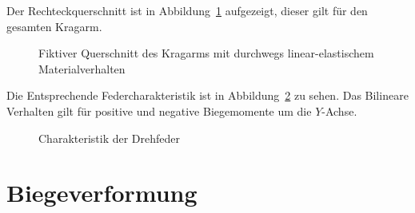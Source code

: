 \documentclass[
  10pt,
  letterpaper,
]{scrreprt}
\begin{document}
Der Rechteckquerschnitt ist in Abbildung~\ref{fig-qs-kragarm}
aufgezeigt, dieser gilt für den gesamten Kragarm.

\begin{figure}[H]


\caption{\label{fig-qs-kragarm}Fiktiver Querschnitt des Kragarms mit
durchwegs linear-elastischem Materialverhalten}

\end{figure}%

Die Entsprechende Federcharakteristik ist in
Abbildung~\ref{fig-springcharacteristic} zu sehen. Das Bilineare
Verhalten gilt für positive und negative Biegemomente um die
\(Y\)-Achse.

\begin{figure}[H]


\caption{\label{fig-springcharacteristic}Charakteristik der Drehfeder}

\end{figure}%

\section{Biegeverformung}\label{biegeverformung}
\end{document}
